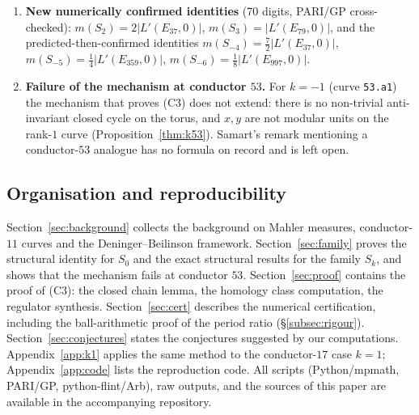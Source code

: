 \documentclass[preprint,12pt]{elsarticle}
\theoremstyle{definition}
\theoremstyle{remark}
\begin{document}
\begin{enumerate}
  which suffices for the conductor-$17$ argument; at $k=-3,-2,-1,2,3$ the
  symbol is not cuspidal). The resulting dichotomy matches all numerical
  evidence:
  Boyd-type identities are proved for $k=0$ and (conditionally on the
  normalization lemma) $k=1$; observed
  numerically for $k\notin[-4,2]$ in all computed cases
  (Conjecture~\ref{conj:family}); and no rational relation is found within
  the PSLQ bound $10^8$ for $k=-1,-2,-3$.
  \item \textbf{New numerically confirmed identities} (70 digits, PARI/GP
  cross-checked): $m(S_2)=2|L'(E_{37},0)|$, $m(S_3)=|L'(E_{79},0)|$, and the
  predicted-then-confirmed identities
  $m(S_{-4})=\tfrac72|L'(E_{37},0)|$,
  $m(S_{-5})=\tfrac14|L'(E_{359},0)|$,
  $m(S_{-6})=\tfrac18|L'(E_{997},0)|$.
  \item \textbf{Failure of the mechanism at conductor $53$.} For $k=-1$
  (curve \texttt{53.a1}) the mechanism that proves (C3) does not extend:
  there is no non-trivial anti-invariant closed cycle on the torus, and
  $x,y$ are not modular units on the rank-$1$ curve
  (Proposition~\ref{thm:k53}). Samart's remark mentioning a conductor-$53$
  analogue has no formula on record and is left open.
\end{enumerate}

\subsection{Organisation and reproducibility}

Section~\ref{sec:background} collects the background on Mahler measures,
conductor-$11$ curves and the Deninger--Beilinson framework.
Section~\ref{sec:family} proves the structural identity for $S_0$ and the
exact structural results for the family $S_k$, and shows that the mechanism
fails at conductor $53$. Section~\ref{sec:proof} contains the proof of
(C3): the closed chain
lemma, the homology class computation, the regulator synthesis.
Section~\ref{sec:cert} describes the numerical certification, including the
ball-arithmetic proof of the period ratio (\S\ref{subsec:rigour}).
Section~\ref{sec:conjectures} states the conjectures suggested by our
computations. Appendix~\ref{app:k1} applies the same method to the
conductor-$17$ case $k=1$; Appendix~\ref{app:code} lists the reproduction
code. All
scripts (Python/mpmath, PARI/GP, python-flint/Arb), raw outputs, and the
sources of this paper are available in the accompanying repository.

\end{document}

